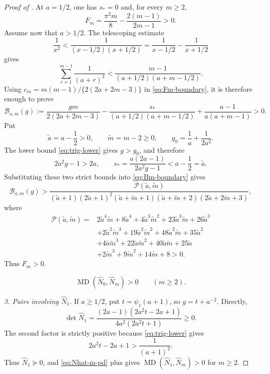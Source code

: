 \documentclass[11pt,a4paper]{amsart}
\numberwithin{equation}{section}
\theoremstyle{plain}
\theoremstyle{definition}
\newcommand{\MD}{\operatorname{MD}}
\begin{document}
\begin{proof}[Proof of ]
At \(a=1/2\), one has \(s_*=0\) and, for every \(m\ge2\),
\[
 F_m=\frac{\pi^2m}{8}-\frac{2(m-1)}{2m-1}>0.
\]
Assume now that \(a>1/2\).  The telescoping estimate
\[
 \frac1{x^2}
 <\frac1{(x-1/2)(x+1/2)}
 =\frac1{x-1/2}-\frac1{x+1/2}
\]
gives
\[
 \sum_{r=1}^{m-1}\frac1{(a+r)^2}
 <\frac{m-1}{(a+1/2)(a+m-1/2)}.
\]
Using \(c_m=m(m-1)/\{2(2a+2m-3)\}\) in
\eqref{eq:Fm-boundary}, it is therefore enough to prove
\begin{equation}\label{eq:Bm-boundary}
 \mathcal B_{a,m}(g)
 :=\frac{gm}{2(2a+2m-3)}
 -\frac{s_*}{(a+1/2)(a+m-1/2)}
 +\frac{a-1}{a(a+m-1)}>0.
\end{equation}
Put
\[
 \tilde a=a-\frac12>0,\qquad \tilde m=m-2\ge0,\qquad
 g_0=\frac1a+\frac1{2a^2}.
\]
The lower bound \eqref{eq:trig-lower} gives \(g>g_0\), and therefore
\[
 2a^2g-1>2a,
 \qquad
 s_*=\frac{a(2a-1)}{2a^2g-1}<a-\frac12=\tilde a.
\]
Substituting these two strict bounds into \eqref{eq:Bm-boundary} gives
\[
 \mathcal B_{a,m}(g)>
 \frac{\mathcal P(\tilde a,\tilde m)}
 {(\tilde a+1)(2\tilde a+1)^2(\tilde a+\tilde m+1)(\tilde a+\tilde m+2)(2\tilde a+2\tilde m+3)},
\]
where
\begin{align*}
 \mathcal P(\tilde a,\tilde m)={}&2\tilde a^4\tilde m+8\tilde a^4+4\tilde a^3\tilde m^2+23\tilde a^3\tilde m+26\tilde a^3\\
 &+2\tilde a^2\tilde m^3+19\tilde a^2\tilde m^2+48\tilde a^2\tilde m+35\tilde a^2\\
 &+4\tilde a\tilde m^3+22\tilde a\tilde m^2+40\tilde a\tilde m+25\tilde a\\
 &+2\tilde m^3+9\tilde m^2+14\tilde m+8>0.
\end{align*}
Thus \(F_m>0\).

\begin{equation}\label{eq:N0Nm-positive-boundary}
 \MD(\widehat N_0,\widehat N_m)>0\qquad(m\ge2).
\end{equation}

\emph{3.  Pairs involving \(\widehat N_1\).}
If \(a\ge1/2\), put \(t=\psi_1(a+1)\), so \(g=t+a^{-2}\).  Directly,
\begin{equation}\label{eq:det-N1-boundary}
 \det\widehat N_1
 =\frac{(2a-1)(2a^2t-2a+1)}{4a^2(2a^2t+1)}\ge0.
\end{equation}
The second factor is strictly positive because \eqref{eq:trig-lower} gives
\[
 2a^2t-2a+1>\frac1{(a+1)^2}.
\]
Thus \(\widehat N_1\succeq0\), and \eqref{eq:Nhat-m-pd} plus
 gives
\(\MD(\widehat N_1,\widehat N_m)>0\) for \(m\ge2\).


\end{proof}
\end{document}
